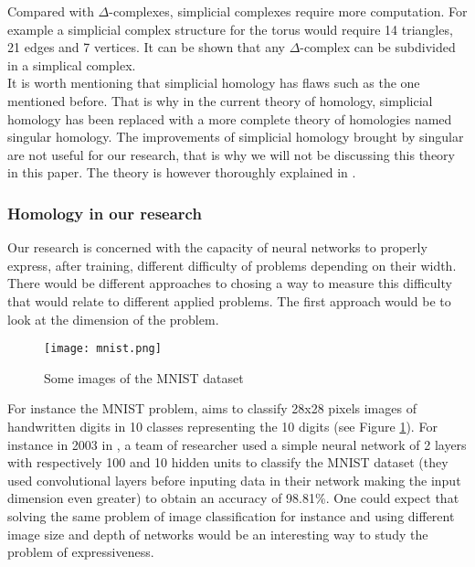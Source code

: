 \documentclass[12pt, a4paper]{article}
\begin{document}
Compared with $\Delta$-complexes, simplicial complexes require more computation. For example a simplicial complex structure for the torus would require 14 triangles, 21 edges and 7 vertices. It can be shown that any $\Delta$-complex can be subdivided in a simplical complex.\\


It is worth mentioning that simplicial homology has flaws such as the one mentioned before. That is why in the current theory of homology, simplicial homology has been replaced with a more complete theory of homologies named singular homology. The improvements of simplicial homology brought by singular are not useful for our research, that is why we will not be discussing this theory in this paper. The theory is however thoroughly explained in \cite{hatcher_algebraic_2002}.

\subsubsection{Homology in our research}
\label{sec:homology_research}

Our research is concerned with the capacity of neural networks to properly express, after training, different difficulty of problems depending on their width. There would be different approaches to chosing a way to measure this difficulty that would relate to different applied problems. The first approach would be to look at the dimension of the problem.\\

\begin{figure}[h]
  \centering
  \texttt{[image: mnist.png]}
  \caption{Some images of the MNIST dataset}
  \label{fig:mnist}
\end{figure}

For instance the MNIST problem, aims to classify 28x28 pixels images of handwritten digits in 10 classes representing the 10 digits (see Figure \ref{fig:mnist}). For instance in 2003 in \cite{simard_best_2003}, a team of researcher used a simple neural network of 2 layers with respectively 100 and 10 hidden units to classify the MNIST dataset (they used convolutional layers before inputing data in their network making the input dimension even greater) to obtain an accuracy of 98.81\%. One could expect that solving the same problem of image classification for instance and using different image size and depth of networks would be an interesting way to study the problem of expressiveness.\\
\end{document}
